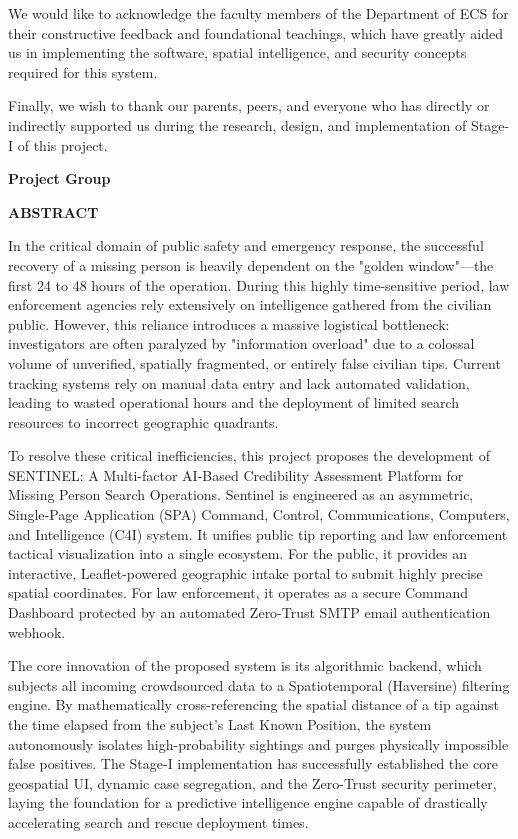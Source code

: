 \documentclass[12pt,a4paper]{report}
\begin{document}
We would like to acknowledge the faculty members of the Department of ECS for their constructive feedback and foundational teachings, which have greatly aided us in implementing the software, spatial intelligence, and security concepts required for this system.

Finally, we wish to thank our parents, peers, and everyone who has directly or indirectly supported us during the research, design, and implementation of Stage-I of this project.

\vspace{2cm}
\begin{flushright}
\textbf{Project Group}
\end{flushright}

\newpage
{}
\begin{center}
\Large \textbf{ABSTRACT}
\end{center}
\vspace{1cm}
In the critical domain of public safety and emergency response, the successful recovery of a missing person is heavily dependent on the "golden window"—the first 24 to 48 hours of the operation. During this highly time-sensitive period, law enforcement agencies rely extensively on intelligence gathered from the civilian public. However, this reliance introduces a massive logistical bottleneck: investigators are often paralyzed by "information overload" due to a colossal volume of unverified, spatially fragmented, or entirely false civilian tips. Current tracking systems rely on manual data entry and lack automated validation, leading to wasted operational hours and the deployment of limited search resources to incorrect geographic quadrants.

To resolve these critical inefficiencies, this project proposes the development of SENTINEL: A Multi-factor AI-Based Credibility Assessment Platform for Missing Person Search Operations. Sentinel is engineered as an asymmetric, Single-Page Application (SPA) Command, Control, Communications, Computers, and Intelligence (C4I) system. It unifies public tip reporting and law enforcement tactical visualization into a single ecosystem. For the public, it provides an interactive, Leaflet-powered geographic intake portal to submit highly precise spatial coordinates. For law enforcement, it operates as a secure Command Dashboard protected by an automated Zero-Trust SMTP email authentication webhook.

The core innovation of the proposed system is its algorithmic backend, which subjects all incoming crowdsourced data to a Spatiotemporal (Haversine) filtering engine. By mathematically cross-referencing the spatial distance of a tip against the time elapsed from the subject's Last Known Position, the system autonomously isolates high-probability sightings and purges physically impossible false positives. The Stage-I implementation has successfully established the core geospatial UI, dynamic case segregation, and the Zero-Trust security perimeter, laying the foundation for a predictive intelligence engine capable of drastically accelerating search and rescue deployment times.
\end{document}
